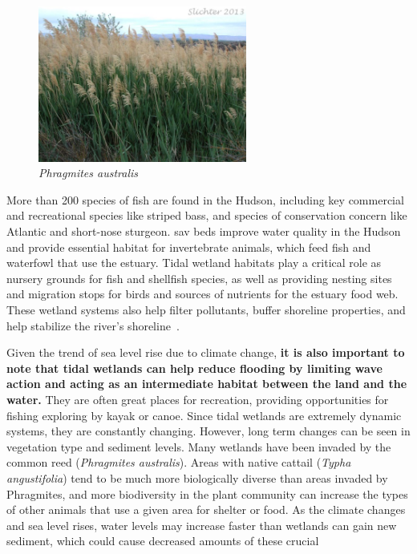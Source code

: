 \begin{figure}
    \includegraphics[width=6.85cm,keepaspectratio]{images/Common_reed.jpg}
    \vspace{-5pt}
  \caption{\textit{Phragmites australis}}
\end{figure}
\begin{displayquote}
More than 200 species of fish are found in the Hudson, including key commercial
and recreational species like striped bass, and species of conservation
concern like Atlantic and short-nose sturgeon. \gls{sav} beds improve water
quality in the Hudson and provide essential habitat for invertebrate
animals, which feed fish and waterfowl that use the estuary. Tidal wetland
habitats play a critical role as nursery grounds for fish and shellfish
species, as well as providing nesting sites and migration stops for birds
and sources of nutrients for the estuary food web. These wetland systems
also help filter pollutants, buffer shoreline properties, and help
stabilize the river’s shoreline~\cite{haeckel2014}.
\end{displayquote}
Given the trend of sea level rise due to climate change, \textbf{it is also
important to note that tidal wetlands can help reduce flooding by limiting wave
action and acting as an intermediate habitat between the land and the water.}
They are often great places for recreation, providing opportunities for fishing
exploring by kayak or canoe. 
Since tidal wetlands are extremely dynamic systems, they are constantly
changing. However, long term changes can be seen in vegetation type and
sediment levels. Many wetlands have been invaded by the common reed
(\textit{Phragmites australis}). Areas with native cattail (\textit{Typha
angustifolia}) tend to be much more biologically diverse than areas invaded by
Phragmites, and more biodiversity in the plant community can increase the types
of other animals that use a given area for shelter or food. As the climate
changes and sea level rises, water levels may increase faster than wetlands can
gain new sediment, which could cause decreased amounts of these crucial
